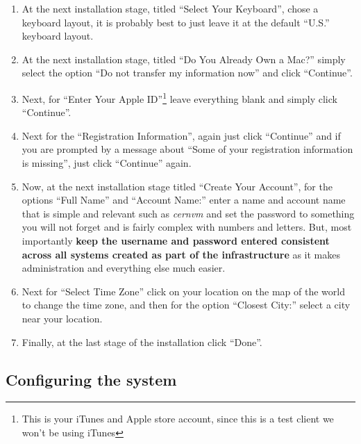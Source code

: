 \begin{enumerate}
\item 	At the next installation stage, titled ``Select Your Keyboard'', chose a keyboard layout, it is probably best to just leave
		it at the default ``U.S.'' keyboard layout.
		
\item	At the next installation stage, titled ``Do You Already Own a Mac?'' simply select the option ``Do not transfer my information
		now'' and click ``Continue''.
		
\item	Next, for ``Enter Your Apple ID''\footnote{This is your iTunes and Apple store account, since this is a test client we won't
		be using iTunes} leave everything blank and simply click ``Continue''.
		
\item	Next for the ``Registration Information'', again just click ``Continue'' and if you are prompted by a message about ``Some
		of your registration information is missing'', just click ``Continue'' again.
		
\item	Now, at the next installation stage titled ``Create Your Account'', for the options ``Full Name'' and ``Account Name:''
		enter a name and account name that is simple and relevant such as \emph{cernvm} and set the password to something you will
		not forget and is fairly complex with numbers and letters. But, most importantly {\bf keep the username and password entered
		consistent across all systems created as part of the infrastructure} as it makes administration and everything else much easier. 
		
\item	Next for ``Select Time Zone'' click on your location on the map of the world to change the time zone, and then for the option
		``Closest City:'' select a city near your location.
		
\item	Finally, at the last stage of the installation click ``Done''.	
\end{enumerate}


\newpage
\subsection{Configuring the system}
\label{sec:osxconfig}

